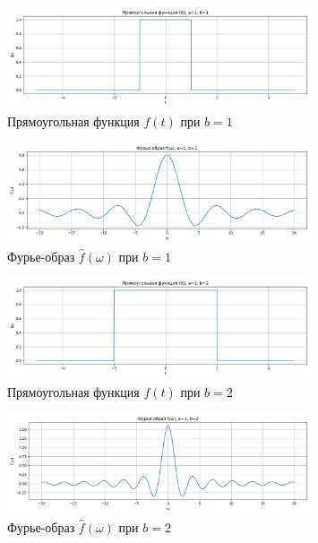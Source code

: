 \begin{figure}[H]
    \centering
    \includegraphics[width=0.8\textwidth]{python/rect_function_b1.png}
    \caption{Прямоугольная функция $f(t)$ при $b = 1$}
\end{figure}

\begin{figure}[H]
    \centering
    \includegraphics[width=0.8\textwidth]{python/rect_fourier_b1.png}
    \caption{Фурье-образ $\hat{f}(\omega)$ при $b = 1$}
\end{figure}

\begin{figure}[H]
    \centering
    \includegraphics[width=0.8\textwidth]{python/rect_function_b2.png}
    \caption{Прямоугольная функция $f(t)$ при $b = 2$}
\end{figure}

\begin{figure}[H]
    \centering
    \includegraphics[width=0.8\textwidth]{python/rect_fourier_b2.png}
    \caption{Фурье-образ $\hat{f}(\omega)$ при $b = 2$}
\end{figure}

